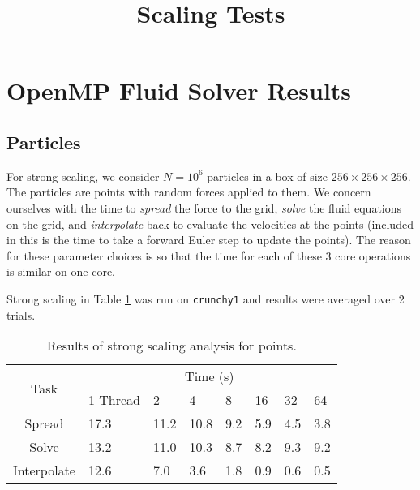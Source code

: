\documentclass[]{article}
\title{Scaling Tests}
\begin{document}
\maketitle

\section{OpenMP Fluid Solver Results}

\subsection{Particles} 
For strong scaling, we consider $N=10^6$ particles in a box of size $256 \times 256 \times 256$. The particles are points with random forces applied to them. We concern ourselves with the time to \textit{spread} the force to the grid, \textit{solve} the fluid equations on the grid, and \textit{interpolate} back to evaluate the velocities at the points (included in this is the time to take a forward Euler step to update the points). The reason for these parameter choices is so that the time for each of these 3 core operations is similar on one core. 

Strong scaling in Table \ref{tab:ptsc} was run on \texttt{crunchy1} and results were averaged over 2 trials. 

\begin{table}
\centering
\begin{tabular}{|c||l|l|l|l|l|l|l|}
	\hline
	\multirow{2}{*}{Task} 
	& \multicolumn{7}{c|}{Time (s)}  \\
	& 1 Thread & 2 & 4 & 8 & 16 & 32 & 64 \\  \hline
	Spread & 17.3 & 11.2 & 10.8 &9.2 &  5.9 & 4.5 & 3.8\\      \hline
	Solve & 13.2 & 11.0  & 10.3 & 8.7 & 8.2  & 9.3 & 9.2\\      \hline
	Interpolate & 12.6 & 7.0 & 3.6 & 1.8 & 0.9 & 0.6 & 0.5\\  \hline
\end{tabular}
\caption{Results of strong scaling analysis for points.}
\label{tab:ptsc}
\end{table}
\end{document}
